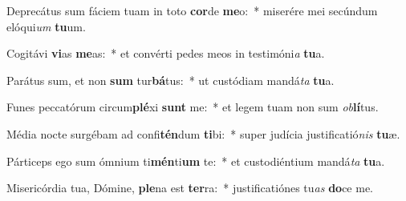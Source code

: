 \item Deprecátus sum fáciem tuam in toto \textbf{cor}de \textbf{me}o:~* miserére mei secúndum elóqui\textit{um} \textbf{tu}um.
\item Cogitávi \textbf{vi}as \textbf{me}as:~* et convérti pedes meos in testimóni\textit{a} \textbf{tu}a.
\item Parátus sum, et non \textbf{sum} tur\textbf{bá}tus:~* ut custódiam mandá\textit{ta} \textbf{tu}a.
\item Funes peccatórum circum\textbf{plé}xi \textbf{sunt} me:~* et legem tuam non sum \textit{ob}\textbf{lí}tus.
\item Média nocte surgébam ad confi\textbf{tén}dum \textbf{ti}bi:~* super judícia justificatió\textit{nis} \textbf{tu}æ.
\item Párticeps ego sum ómnium ti\textbf{mén}ti\textbf{um} te:~* et custodiéntium mandá\textit{ta} \textbf{tu}a.
\item Misericórdia tua, Dómine, \textbf{ple}na est \textbf{ter}ra:~* justificatiónes tu\textit{as} \textbf{do}ce me.
